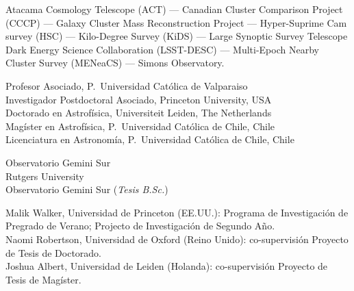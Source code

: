 \documentclass[11pt]{article}
\begin{document}
\vspace{0.5cm}
{
 Atacama Cosmology Telescope (ACT) ---
 Canadian Cluster Comparison Project (CCCP) ---
 Galaxy Cluster Mass Reconstruction Project ---
 Hyper-Suprime Cam survey (HSC) ---
 Kilo-Degree Survey (KiDS) ---
 Large Synoptic Survey Telescope Dark Energy Science Collaboration (LSST-DESC) ---
 Multi-Epoch Nearby Cluster Survey (MENeaCS) ---
 Simons Observatory.
}



\noindent
{} Profesor Asociado, P.~Universidad Cat\'olica de Valparaiso\\
 Investigador Postdoctoral Asociado, Princeton University, USA\\
 Doctorado en Astrof\'isica, Universiteit Leiden, The Netherlands\\
 Mag\'ister en Astrof\'isica, P.~Universidad Cat\'olica de Chile, Chile\\
 Licenciatura en Astronom\'ia, P.~Universidad Cat\'olica de Chile, Chile



\noindent
{} Observatorio Gemini Sur\\
 Rutgers University\\
 Observatorio Gemini Sur (\emph{Tesis B.Sc.})\\




\noindent
{} Malik Walker, Universidad de Princeton (EE.UU.): Programa de Investigaci\'on de Pregrado de Verano; Projecto de Investigaci\'on de Segundo A\~no.\\
 Naomi Robertson, Universidad de Oxford (Reino Unido): co-supervisi\'on Proyecto de Tesis de Doctorado.\\
 Joshua Albert, Universidad de Leiden (Holanda): co-supervisi\'on Proyecto de Tesis de Mag\'ister.

\end{document}
